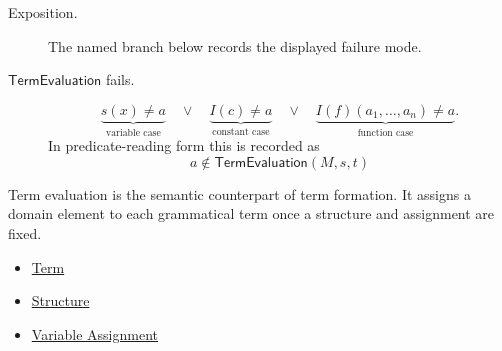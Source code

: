 \begin{remark*}
\begin{description}
  \item[Exposition.] The named branch below records the displayed failure mode.
\item[\(\mathsf{TermEvaluation}\) fails.] \[
\underbrace{s(x)\neq a}_{\text{variable case}}
\quad\lor\quad
\underbrace{I(c)\neq a}_{\text{constant case}}
\quad\lor\quad
\underbrace{I(f)(a_1,\ldots,a_n)\neq a}_{\text{function case}}.
\]
  In predicate-reading form this is recorded as
  \[
    a\notin\mathsf{TermEvaluation}(M,s,t)
  \]
\end{description}
\end{remark*}

\begin{remark*}[Interpretation]
Term evaluation is the semantic counterpart of term formation. It assigns a
domain element to each grammatical term once a structure and assignment are
fixed.
\end{remark*}

\begin{dependencies}
\begin{itemize}
  \item \hyperref[def:term]{Term}
  \item \hyperref[def:structure]{Structure}
  \item \hyperref[def:var-assign]{Variable Assignment}
\end{itemize}
\end{dependencies}
